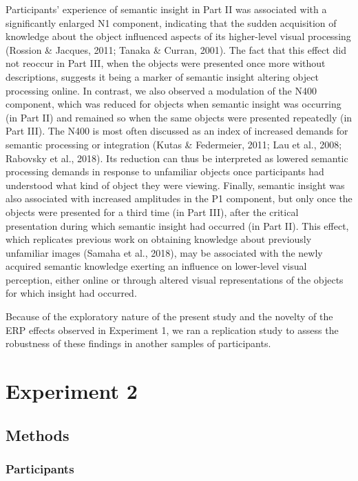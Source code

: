 \documentclass[
  english,
  man,11pt,floatsintext]{apa7}
\begin{document}
Participants' experience of semantic insight in Part II was associated with a significantly enlarged N1 component, indicating that the sudden acquisition of knowledge about the object influenced aspects of its higher-level visual processing (Rossion \& Jacques, 2011; Tanaka \& Curran, 2001). The fact that this effect did not reoccur in Part III, when the objects were presented once more without descriptions, suggests it being a marker of semantic insight altering object processing online. In contrast, we also observed a modulation of the N400 component, which was reduced for objects when semantic insight was occurring (in Part II) and remained so when the same objects were presented repeatedly (in Part III). The N400 is most often discussed as an index of increased demands for semantic processing or integration (Kutas \& Federmeier, 2011; Lau et al., 2008; Rabovsky et al., 2018). Its reduction can thus be interpreted as lowered semantic processing demands in response to unfamiliar objects once participants had understood what kind of object they were viewing. Finally, semantic insight was also associated with increased amplitudes in the P1 component, but only once the objects were presented for a third time (in Part III), after the critical presentation during which semantic insight had occurred (in Part II). This effect, which replicates previous work on obtaining knowledge about previously unfamiliar images (Samaha et al., 2018), may be associated with the newly acquired semantic knowledge exerting an influence on lower-level visual perception, either online or through altered visual representations of the objects for which insight had occurred.

Because of the exploratory nature of the present study and the novelty of the ERP effects observed in Experiment 1, we ran a replication study to assess the robustness of these findings in another samples of participants.

\hypertarget{experiment-2}{%
\section{Experiment 2}\label{experiment-2}}

\hypertarget{methods-1}{%
\subsection{Methods}\label{methods-1}}

\hypertarget{participants-1}{%
\subsubsection{Participants}\label{participants-1}}
\end{document}
